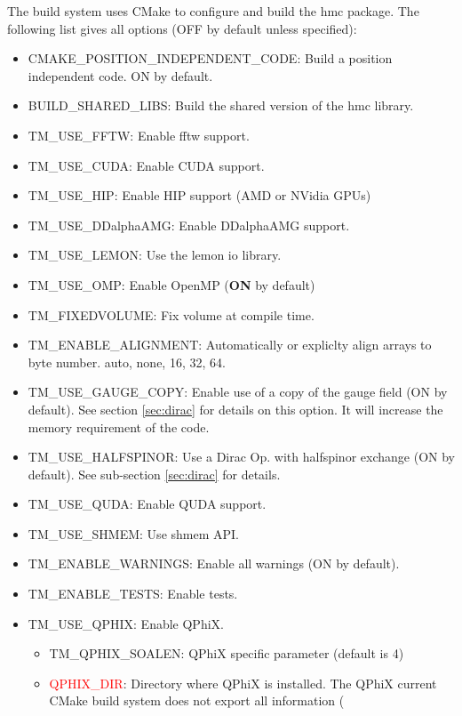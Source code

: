 The build system uses CMake to configure and build the hmc package. The
following list gives all options (OFF by default unless specified):
\begin{itemize}
\item {\ttfamily CMAKE\_POSITION\_INDEPENDENT\_CODE}: Build a position independent
  code. ON by default.
\item {\ttfamily BUILD\_SHARED\_LIBS}: Build the shared version of the hmc library.
\item {\ttfamily TM\_USE\_FFTW}: Enable fftw support. 
\item {\ttfamily TM\_USE\_CUDA}: Enable CUDA support.
\item {\ttfamily TM\_USE\_HIP}: Enable HIP support (AMD or NVidia GPUs)
\item {\ttfamily TM\_USE\_DDalphaAMG}: Enable DDalphaAMG support.
\item {\ttfamily TM\_USE\_LEMON}: Use the lemon io library.
\item {\ttfamily TM\_USE\_OMP}: Enable OpenMP ({\bf ON} by default)
\item {\ttfamily TM\_FIXEDVOLUME}: Fix volume at compile time.
\item {\ttfamily TM\_ENABLE\_ALIGNMENT}: Automatically or expliclty align arrays to
  byte number. auto, none, 16, 32, 64.
\item {\ttfamily TM\_USE\_GAUGE\_COPY}: Enable use of a copy of the gauge field (ON
  by default). See section \ref{sec:dirac} for details on this option. It will
  increase the memory requirement of the code.
\item {\ttfamily TM\_USE\_HALFSPINOR}: Use a Dirac Op. with halfspinor exchange (ON
  by default). See sub-section \ref{sec:dirac} for details. 
\item {\ttfamily TM\_USE\_QUDA}: Enable QUDA support.
\item {\ttfamily TM\_USE\_SHMEM}: Use shmem API.
\item {\ttfamily TM\_ENABLE\_WARNINGS}: Enable all warnings (ON by default).
\item {\ttfamily TM\_ENABLE\_TESTS}: Enable tests.
\item {\ttfamily TM\_USE\_QPHIX}: Enable QPhiX.
  \begin{itemize}
  \item {\ttfamily TM\_QPHIX\_SOALEN}: QPhiX specific parameter (default is 4)
  \item \textcolor{red}{{\ttfamily QPHIX\_DIR}}: Directory where QPhiX is installed.
    The QPhiX current CMake build system does not export all information (

\end{itemize}
\end{itemize}
